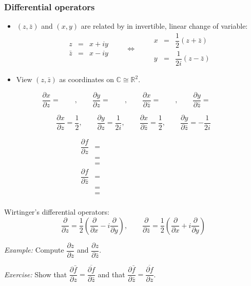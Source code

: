 \documentclass[xcolor={dvipsnames}]{beamer}
\newcommand{\RR}{\mathbb{R}}
\newcommand{\CC}{\mathbb{C}}
\newcommand{\pd}[2]{\dfrac{\partial#1}{\partial#2}}
\begin{document}
 
\begin{frame}
\frametitle{Differential operators}
\begin{itemize}
\item  $(z,\bar z)$ and $(x,y)$ are related by in invertible, linear change of variable:
\[
    \begin{matrix}
        z & = & x + iy\\[2ex]
        \bar z & = & x - iy
    \end{matrix}\qquad
    \Longleftrightarrow
    \qquad
    \begin{matrix}
        x & = & \dfrac12(z + \bar z)\\[2ex]
        y & = & \dfrac1{2i}(z - \bar z)
    \end{matrix}
\]
\item View $(z,\bar z)$ as coordinates on $\CC\cong\RR^2$.
\end{itemize}

\[
    \pd xz = \qquad,\qquad \pd yz=\qquad,\qquad
    \pd x{\bar{z}} = \qquad,\qquad \pd y{\bar{z}}=\qquad
\]
\end{frame}

\begin{frame}[t]
    \[
        \pd xz = \frac12,\qquad \pd yz=\frac1{2i},\qquad
        \pd x{\bar{z}} = \frac12,\qquad \pd y{\bar{z}}=-\frac1{2i}
    \]

    \begin{align*}
        \pd{f}{z} &= \hspace{2in}\\[3.25ex] %
        &= \\[3.25ex]
        &= \\[3.25ex]
        \pd{f}{\bar z} &= \\[3.25ex]
        &= \\[3.25ex]
        &= \\[3.25ex]
    \end{align*}
\end{frame}

\begin{frame}[t]
    Wirtinger's differential operators:
    \[
        \pd{}{z} = \frac12\left(\pd{}x - i\pd{}y\right),\qquad \pd{}{\bar z} = \frac12\left(\pd{}x + i\pd{}y\right)
    \]

    \emph{Example:} Compute $\pd zz$ and $\pd z{\bar z}$.

    \vspace{1.9in}
    \emph{Exercise:} Show that $\pd{\bar f}z = \overline{\pd f{\bar z}}$ and that
    $\pd{\bar f}{\bar z} = \overline{\pd f{z}}$.
\end{frame}
\end{document}
